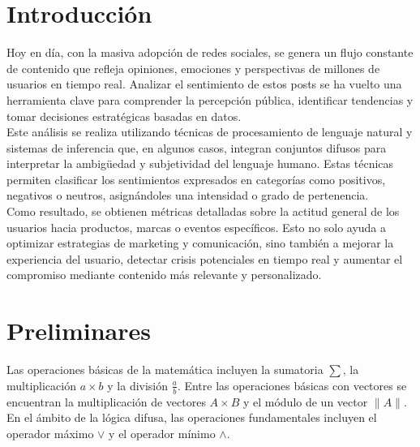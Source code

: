 \documentclass[sigconf, review=false, nonacm]{acmart}
\begin{document}
\maketitle

\section{Introducción}
Hoy en día, con la masiva adopción de redes sociales, se genera un flujo constante de contenido que refleja
opiniones, emociones y perspectivas de millones de usuarios en tiempo real. Analizar el sentimiento de estos
posts se ha vuelto una herramienta clave para comprender la percepción pública, identificar tendencias y tomar
decisiones estratégicas basadas en datos.\\

Este análisis se realiza utilizando técnicas de procesamiento de lenguaje natural y sistemas de inferencia
que, en algunos casos, integran conjuntos difusos para interpretar la ambigüedad y subjetividad del lenguaje
humano. Estas técnicas permiten clasificar los sentimientos expresados en categorías como positivos, negativos
o neutros, asignándoles una intensidad o grado de pertenencia.\\

Como resultado, se obtienen métricas detalladas sobre la actitud general de los usuarios hacia productos,
marcas o eventos específicos. Esto no solo ayuda a optimizar estrategias de marketing y comunicación, sino
también a mejorar la experiencia del usuario, detectar crisis potenciales en tiempo real y aumentar el
compromiso mediante contenido más relevante y personalizado.

\section{Preliminares}
Las operaciones básicas de la matemática incluyen la sumatoria $ \sum $, la multiplicación $ a \times b $
y la división $ \frac{a}{b} $. Entre las operaciones básicas con vectores se encuentran la multiplicación de
vectores $ A \times B $ y el módulo de un vector $ \| A \| $. En el ámbito de la lógica difusa, las
operaciones fundamentales incluyen el operador máximo $ \vee $ y el operador mínimo $ \wedge $.\\
\end{document}
